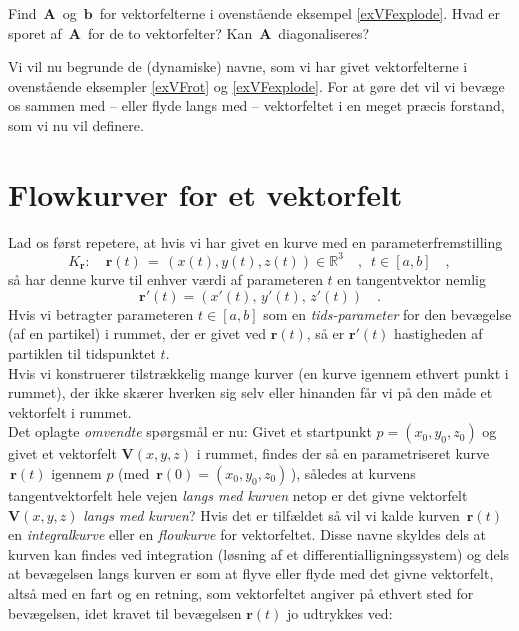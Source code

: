 \begin{exercise} \label{exerVFexplode}
Find ${\,\mathbf{A}\,}$ og $\,{\mathbf{b}}\,$ for vektorfelterne i ovenstående
eksempel \ref{exVFexplode}. Hvad er sporet af ${\,\mathbf{A}\,}$ for de to vektorfelter? Kan
${\,\mathbf{A}\,}$ diagonaliseres?
\end{exercise}

Vi vil nu begrunde de (dynamiske) navne, som vi har givet
vektorfelterne i ovenstående eksempler \ref{exVFrot} og \ref{exVFexplode}.
For at gøre det vil vi bevæge os sammen med -- eller flyde langs med -- vektorfeltet i en meget præcis forstand,
som vi nu vil definere.


\section{Flowkurver for et vektorfelt} \label{secFlow}
Lad os først repetere, at hvis vi har
givet en kurve med en parameterfremstilling
\begin{equation}
K_{\mathbf r}: \quad {\mathbf r}(t) \, = \, \left(x(t), y(t), z(t)\right)
\in \mathbb{R}^3 \quad , \, \, \,  t \in [a,b] \quad,
\end{equation}
så har denne kurve til enhver værdi af parameteren $t$  en tangentvektor nemlig
\begin{equation}
{\mathbf{r'}}(t) = (x'(t), \,y'(t),
\,z'(t))\quad .
\end{equation}
Hvis vi betragter parameteren $t\in [a,b]$ som en \emph{tids-parameter} for den
bevægelse (af en partikel)  i rummet, der er givet ved ${\mathbf r}(t)$, så er
${\mathbf{r'}}(t)$ hastigheden af partiklen til tidspunktet $t$.\\

Hvis vi konstruerer tilstrækkelig mange kurver (en kurve igennem ethvert punkt i rummet), der ikke skærer hverken sig selv eller hinanden får
vi på den måde et vektorfelt i rummet.\\

Det oplagte {\em{omvendte}} spørgsmål er nu: Givet et startpunkt $p
= (x_{0}, y_{0}, z_{0})$ og givet et vektorfelt ${\mathbf{V}}(x,y,z)$ i
rummet, findes der så en parametriseret kurve $\,{\mathbf{r}}(t)$
igennem $p$ (med $\,{\mathbf{r}}(0) = (x_{0}, y_{0}, z_{0})\,$), således
at kurvens tangentvektorfelt hele vejen {\em{langs med kurven}}
netop er det givne vektorfelt ${\mathbf{V}}(x,y,z)$ {\em{langs med
kurven}}? Hvis det er tilfældet så vil vi kalde kurven $\,{\mathbf{r}}(t)$
en \emph{integralkurve} eller en \emph{flowkurve} for vektorfeltet.
Disse
navne skyldes dels at kurven kan findes ved integration (løsning af et
differentialligningssystem) og dels at bevægelsen langs kurven er
som at flyve eller flyde  med det givne vektorfelt, altså med en fart og en
retning, som vektorfeltet angiver på ethvert sted for bevægelsen, idet kravet til bevægelsen
$\mathbf{r}(t)$  jo udtrykkes ved:

